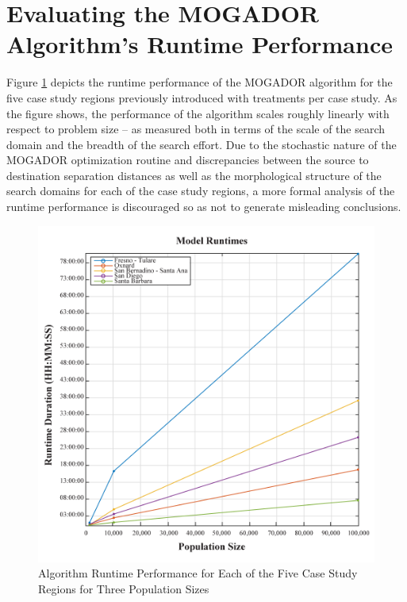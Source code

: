 \clearpage
    
\section{Evaluating the MOGADOR Algorithm's Runtime Performance}

Figure \ref{fig:Runtimes} depicts the runtime performance of the MOGADOR algorithm for the five case study regions previously introduced with treatments per case study. As the figure shows, the performance of the algorithm scales roughly linearly with respect to problem size -- as measured both in terms of the scale of the search domain and the breadth of the search effort. Due to the stochastic nature of the MOGADOR optimization routine and discrepancies between the source to destination separation distances as well as the morphological structure of the search domains for each of the case study regions, a more formal analysis of the runtime performance is discouraged so as not to generate misleading conclusions. 

    \begin{figure}[!h]
        \begin{center}
        \includegraphics[width=5.5in]{figures/Runtimes.png}
        \caption{Algorithm Runtime Performance for Each of the Five Case Study Regions for Three Population Sizes}
        \label{fig:Runtimes}
        \end{center}
    \end{figure}
    
